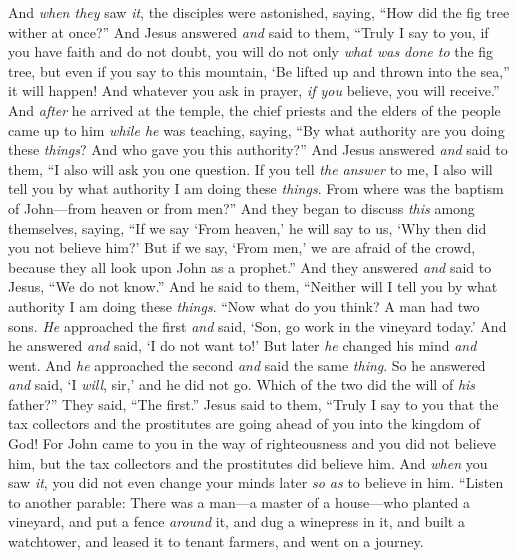 \begin{biblechapter}
\verse And \textit{when they} saw \textit{it}, the disciples were astonished, saying, “How did the fig tree wither at once?”
\verse And Jesus answered \textit{and} said to them, “Truly I say to you, if you have faith and do not doubt, you will do not only \textit{what was done to} the fig tree, but even if you say to this mountain, ‘Be lifted up and thrown into the sea,” it will happen!
\verse And whatever you ask in prayer, \textit{if you} believe, you will receive.”
 And \textit{after} he arrived at the temple, the chief priests and the elders of the people came up to him \textit{while he} was teaching, saying, “By what authority are you doing these \textit{things}? And who gave you this authority?”
\verse And Jesus answered \textit{and} said to them, “I also will ask you one question. If you tell \textit{the answer} to me, I also will tell you by what authority I am doing these \textit{things}.
\verse From where was the baptism of John—from heaven or from men?” And they began to discuss \textit{this} among themselves, saying, “If we say ‘From heaven,’ he will say to us, ‘Why then did you not believe him?’
\verse But if we say, ‘From men,’ we are afraid of the crowd, because they all look upon John as a prophet.”
\verse And they answered \textit{and} said to Jesus, “We do not know.” And he said to them, “Neither will I tell you by what authority I am doing these \textit{things}.
 “Now what do you think? A man had two sons. \textit{He} approached the first \textit{and} said, ‘Son, go work in the vineyard today.’
\verse And he answered \textit{and} said, ‘I do not want to!’ But later \textit{he} changed his mind \textit{and} went.
\verse And \textit{he} approached the second \textit{and} said the same \textit{thing}. So he answered \textit{and} said, ‘I \textit{will}, sir,’ and he did not go.
\verse Which of the two did the will of \textit{his} father?” They said, “The first.” Jesus said to them, “Truly I say to you that the tax collectors and the prostitutes are going ahead of you into the kingdom of God!
\verse For John came to you in the way of righteousness and you did not believe him, but the tax collectors and the prostitutes did believe him. And \textit{when} you saw \textit{it}, you did not even change your minds later \textit{so as} to believe in him.
 “Listen to another parable: There was a man—a master of a house—who planted a vineyard, and put a fence \textit{around} it, and dug a winepress in it, and built a watchtower, and leased it to tenant farmers, and went on a journey.

\end{biblechapter}

